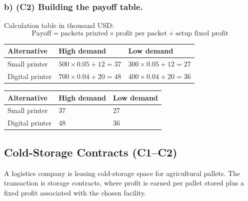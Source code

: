 	\subsubsection*{b) \textbf{(C2)} Building the payoff table.}
	\label{subsec:problem18-local-printing-contracts-c2}
	Calculation table in thousand USD:
	\[
	\text{Payoff}=\text{packets printed}\times\text{profit per packet}+\text{setup fixed profit}
	\]
	\begin{center}
		\begin{tabular}{lll}
			\toprule
			Alternative & High demand & Low demand \\
			\midrule
			Small printer & $500 \times 0.05 + 12 = 37$ & $300 \times 0.05 + 12 = 27$ \\
			Digital printer & $700 \times 0.04 + 20 = 48$ & $400 \times 0.04 + 20 = 36$ \\
			\bottomrule
		\end{tabular}
	\end{center}
	
	\begin{center}
		\begin{tabular}{lll}
			\toprule
			Alternative & High demand & Low demand \\
			\midrule
			Small printer & 37 & 27 \\
			Digital printer & 48 & 36 \\
			\bottomrule
		\end{tabular}
	\end{center}
	
	
	\subsection{Cold-Storage Contracts (C1--C2)}
	\label{sec:problem11-cold-storage-contracts-c1-c2}
	A logistics company is leasing cold-storage space for agricultural pallets. The transaction is storage contracts, where profit is earned per pallet stored plus a fixed profit associated with the chosen facility.
	
